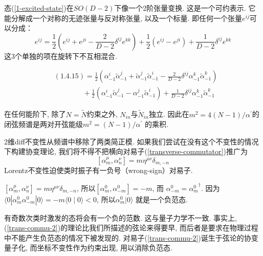 态(\ref{1-excited-state})在$SO(D-2)$下像一个2阶张量变换. 这是一个可约表示. 它能分解成一个对称的无迹张量与反对称张量, 以及一个标量. 即任何一个张量$e^{ij}$可以分成：
\begin{equation}
e^{i j}=\frac{1}{2}\left(e^{i j}+e^{j i}-\frac{2}{D-2} \delta^{i j} e^{k k}\right)+\frac{1}{2}\left(e^{i j}-e^{j i}\right)+\frac{1}{D-2} \delta^{i j} e^{k k}
\end{equation}
这3个单独的项在旋转下不互相混合. \\
\begin{remark}
\begin{align*}
    &(1.4.15)= 
    \frac{1}{2}\left(\alpha_{-1}^{i} \tilde{\alpha}_{-1}^{j}+\tilde{\alpha}_{-1}^{j} \tilde{\alpha}_{-1}^{i}-\frac{2}{D-2} \delta^{i j} \alpha_{-1}^{k} \tilde{\alpha}_{-1}^{k}\right)\\
    &\qquad\qquad+\frac{1}{2}\left(\alpha_{-1}^{i} \tilde{\alpha}_{-1}^{j}-\alpha_{-1}^{j} \tilde{\alpha}_{-1}^{i}\right)
    +\frac{1}{D-2} \delta^{i j} \alpha_{-1}^{k} \tilde{\alpha}_{-1}^{k} 
\end{align*}
\end{remark}


在任何能阶下, 除了$N=\tilde{N}$约束之外, $N_{in}$与$\tilde{N}_{in}$独立. 因此在$m^{2}=4(N-1)/\alpha^{\prime}$的闭弦频谱是两对开弦能级$m^{2}=(N-1) / \alpha^{\prime}$ 的乘积. 

2维diff不变性从频谱中移除了两类简正模. 如果我们尝试在没有这个不变性的情况下构建协变理论, 我们将不得不把横向对易子(\ref{transverse-commutator})推广为
\begin{equation}
\left[\alpha_{m}^{\mu}, \alpha_{n}^{\nu}\right]=m \eta^{\mu \nu} \delta_{m,-n} \label{trans-commu-2}
\end{equation}
Lorentz不变性迫使类时振子有一负号（wrong-sign）对易子. 

\begin{remark}
    $\left[\alpha_{m}^{\mu}, \alpha_{n}^{\nu}\right]=m \eta^{\mu \nu} \delta_{m,-n}$, 所以$\left[\alpha_{m}^{0}, \alpha_{-m}^{0}\right]=-m$, 而
$\alpha_{-m}^{0}={\alpha_{m}^{0}}^\dagger$. 因为$\langle 0|\alpha_{m}^{0} \alpha_{-m}^{0}| 0\rangle=-m\langle 0 \mid 0\rangle<0$, 所以$\alpha_{m}^{0}\vert 0\rangle$ 就是一个负范态.
\end{remark}
\noindent 有奇数次类时激发的态将会有一个负的范数. 这与量子力学不一致. 
事实上, (\ref{trans-commu-2})的理论比我们所描述的弦论来得要早, 而后者是要求在物理过程中不能产生负范态的情况下被发现的. 对易子(\ref{trans-commu-2})诞生于弦论的协变量子化, 而坐标不变性作为约束出现, 用以消除负范态. 

